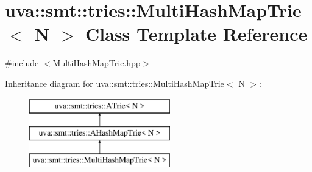 \hypertarget{classuva_1_1smt_1_1tries_1_1_multi_hash_map_trie}{}\section{uva\+:\+:smt\+:\+:tries\+:\+:Multi\+Hash\+Map\+Trie$<$ N $>$ Class Template Reference}
\label{classuva_1_1smt_1_1tries_1_1_multi_hash_map_trie}


{\ttfamily \#include $<$Multi\+Hash\+Map\+Trie.\+hpp$>$}

Inheritance diagram for uva\+:\+:smt\+:\+:tries\+:\+:Multi\+Hash\+Map\+Trie$<$ N $>$\+:\begin{figure}[H]
\begin{center}
\leavevmode
\includegraphics[height=3.000000cm]{classuva_1_1smt_1_1tries_1_1_multi_hash_map_trie}
\end{center}
\end{figure}
